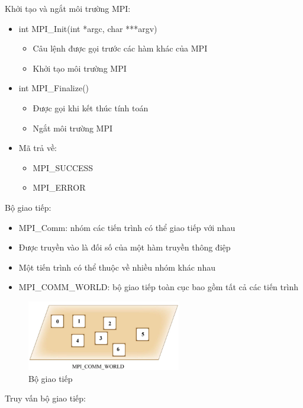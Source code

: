 \documentclass[14pt, a4paper]{article}
\numberwithin{equation}{section}
\numberwithin{figure}{section}
\numberwithin{dl}{section}
\numberwithin{md}{section}
\numberwithin{bd}{section}
\numberwithin{dn}{section}
\numberwithin{hq}{section}
\begin{document}
Khởi tạo và ngắt môi trường MPI:

\begin{itemize}
    \item int MPI\_Init(int *argc, char ***argv) 
    \begin{itemize}
        \item Câu lệnh được gọi trước các hàm khác của MPI
        \item Khởi tạo môi trường MPI
    \end{itemize}
    \item int MPI\_Finalize()
    \begin{itemize}
        \item Được gọi khi kết thúc tính toán
        \item Ngắt môi trường MPI
    \end{itemize}
    \item Mã trả về:
    \begin{itemize}
        \item MPI\_SUCCESS
        \item MPI\_ERROR
    \end{itemize}
\end{itemize}

Bộ giao tiếp:

\begin{itemize}
    \item MPI\_Comm: nhóm các tiến trình có thể giao tiếp với nhau
    \item Được truyền vào là đối số của một hàm truyền thông điệp
    \item Một tiến trình có thể thuộc về nhiều nhóm khác nhau
    \item MPI\_COMM\_WORLD: bộ giao tiếp toàn cục bao gồm tất cả các tiến trình
\end{itemize}
\begin{figure}[H]
    \centering
    \includegraphics[width=0.6\textwidth]{figures/MPI/MPI_COMM_WORLD.png}
    \caption{Bộ giao tiếp}
\end{figure}

Truy vấn bộ giao tiếp:
\end{document}
